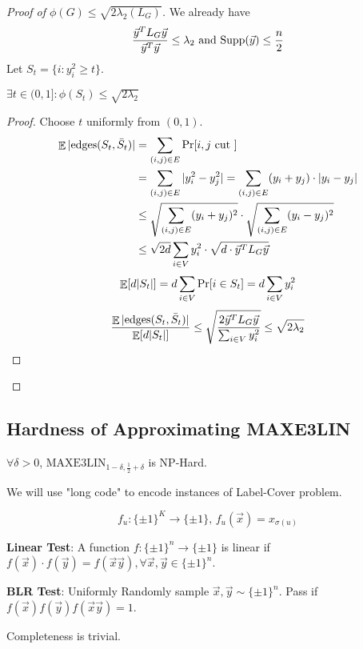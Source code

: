 \begin{proof}[Proof of  $\phi(G) \leq \sqrt{2\lambda_2(L_G)} $]
    We already have 
    \[\frac{\vec{y}^TL_G\vec{y}}{\vec{y}^T\vec{y}} \leq \lambda_2\text{ and }\mathrm{Supp}(\vec{y}) \leq \frac{n}{2}\]
    Let  $ S_t=\{i:y_i^2 \geq t\} $.
    \begin{claim}
        $ \exists t\in (0,1]:\phi(S_t) \leq \sqrt{2\lambda_2} $
    \end{claim} 
    \begin{proof}
        Choose  $ t  $ uniformly from  $ (0,1) $.
        \[\begin{aligned}
            \mathop\mathbb E|\mathrm{edges}(S_t,\bar{S}_t)|&=\sum_{(i,j)\in E}\mathrm{Pr}[i,j\text{ cut }]\\
            &=\sum_{(i,j)\in E}|y_i^2-y_j^2|=\sum_{(i,j)\in E}(y_i+y_j)\cdot|y_i-y_j|\\
            & \leq \sqrt{\sum_{(i,j)\in E}(y_i+y_j)^2}\cdot\sqrt{\sum_{(i,j)\in E}(y_i-y_j)^2}\\
            & \leq \sqrt{2d}\sum_{i\in V}y_i^2\cdot\sqrt{d\cdot\vec{y}^TL_G\vec{y}}
        \end{aligned}\] 
        \[\mathop\mathbb E[d|S_t|]=d\sum_{i\in V}\mathrm{Pr}[i\in S_t]=d\sum_{i\in V}y_i^2\]
        \[\displaystyle\frac{\mathop\mathbb E|\mathrm{edges}(S_t,\bar{S}_t)|}{\mathop\mathbb E[d|S_t|]} \leq \sqrt{\frac{2\vec{y}^TL_G\vec{y}}{\sum_{i\in V}y_i^2}} \leq \sqrt{2\lambda_2}\]
    \end{proof}
\end{proof}
\subsection{Hardness of Approximating MAXE3LIN}
\begin{theorem}
    $ \forall \delta>0 $,  $ \mathrm{MAXE3LIN}_{1-\delta,\frac{1}{2}+\delta} $ is NP-Hard.  
\end{theorem}

We will use "long code" to encode instances of Label-Cover problem.

\[f_u:\{\pm 1\}^K\rightarrow\{\pm 1\},\,f_u(\vec{x})=x_{\sigma(u)}\]

\textbf{Linear Test}: A function  $ f:\{\pm 1\}^n\rightarrow \{\pm 1\} $ is linear if  $ f(\vec{x})\cdot f(\vec{y})=f(\vec{x}\vec{y}),\forall \vec{x},\vec{y}\in \{\pm 1\}^n $.

\textbf{BLR Test}: Uniformly Randomly sample  $ \vec{x},\vec{y}\sim \{\pm 1\}^n $. Pass if  $ f(\vec{x})f(\vec{y})f(\vec{x}\vec{y})=1 $.

Completeness is trivial.

